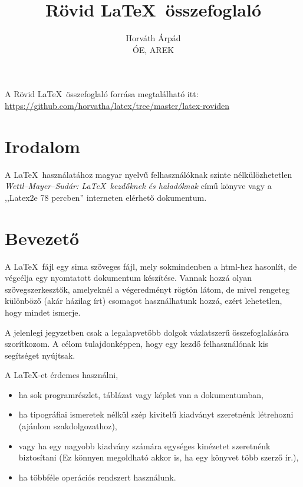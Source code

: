 \documentclass[a4paper]{article}
\begin{document}
\title{Rövid \LaTeX\ összefoglaló}
\author{Horváth Árpád\\ÓE, AREK}
\maketitle

A Rövid \LaTeX\ összefoglaló forrása megtalálható itt:
\url{https://github.com/horvatha/latex/tree/master/latex-roviden}

\section*{Irodalom}
A \LaTeX\ használatához magyar nyelvű felhasználóknak szinte nélkülözhetetlen
\emph{ Wettl--Mayer--Sudár: \LaTeX\ kezdőknek és haladóknak} című könyve
vagy a ,,Latex2e 78 percben'' interneten elérhető dokumentum. 

\section*{Bevezető}

A \LaTeX\ fájl egy sima szöveges fájl, mely sokmindenben a html-hez hasonlít,
de végcélja egy nyomtatott dokumentum készítése.
Vannak hozzá olyan szövegszerkesztők, amelyeknél a végeredményt rögtön látom,
de mivel rengeteg különböző (akár házilag írt) csomagot használhatunk hozzá,
ezért lehetetlen, hogy mindet ismerje.

A jelenlegi jegyzetben csak a legalapvetőbb dolgok
vázlatszerű összefoglalására szorítkozom.
 A célom tulajdonképpen, hogy egy kezdő felhasználónak
kis segítséget nyújtsak.

\csakeloadas{\newpage}

A \LaTeX-et érdemes használni, 
\begin{itemize}
\item ha sok programrészlet, táblázat vagy képlet van a dokumentumban, 
\item ha tipográfiai ismeretek nélkül szép kivitelű kiadványt szeretnénk létrehozni
	(ajánlom szakdolgozathoz),
\item vagy ha egy nagyobb kiadvány számára egységes kinézetet szeretnénk biztosítani (Ez könnyen megoldható akkor is, ha  egy könyvet több szerző ír.),
\item ha többféle operációs rendszert használunk.
\end{itemize}
\end{document}
